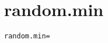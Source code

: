 \section{random.min}
\label{configuration:RandomMin}
\ClearAPI
\TODO
\begin{lstlisting}[style=Props,caption={Usage example for \textit{random.min}}]
random.min=
\end{lstlisting}